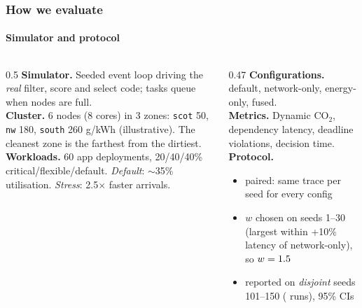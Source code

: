 \documentclass[aspectratio=169,11pt]{beamer}
\begin{document}
\begin{frame}[t]
\frametitle{How we evaluate}
\framesubtitle{Simulator and protocol}
\begin{columns}[T]
\begin{column}{0.5\textwidth}
\small
\textbf{Simulator.} Seeded event loop driving the \emph{real} filter, score and select code; tasks queue when nodes are full.\\[3pt]
\textbf{Cluster.} 6 nodes (8 cores) in 3 zones: \texttt{scot} 50, \texttt{nw} 180, \texttt{south} 260 g/kWh (illustrative). The cleanest zone is the farthest from the dirtiest.\\[3pt]
\textbf{Workloads.} 60 app deployments, 20/40/40\% critical/flexible/default. \emph{Default}: $\sim$35\% utilisation. \emph{Stress}: 2.5$\times$ faster arrivals.
\end{column}
\begin{column}{0.47\textwidth}
\small
\textbf{Configurations.} default, network-only, energy-only, fused.\\[2pt]
\textbf{Metrics.} Dynamic CO$_2$, dependency latency, deadline violations, decision time.\\[2pt]
\textbf{Protocol.}
\begin{itemize}\footnotesize
\item paired: same trace per seed for every config
\item $w$ chosen on seeds 1--30 (largest within +10\% latency of network-only), so $w=1.5$
\item reported on \emph{disjoint} seeds 101--150 (\NSeeds{} runs), 95\% CIs
\end{itemize}
\end{column}
\end{columns}
\end{frame}
\end{document}
